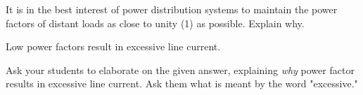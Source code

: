 

It is in the best interest of power distribution systems to maintain the power factors of distant loads as close to unity (1) as possible.  Explain why.







Low power factors result in excessive line current.







Ask your students to elaborate on the given answer, explaining {\it why} power factor results in excessive line current.  Ask them what is meant by the word "excessive."




